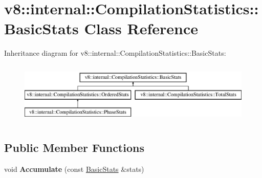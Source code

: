 \hypertarget{classv8_1_1internal_1_1_compilation_statistics_1_1_basic_stats}{}\section{v8\+:\+:internal\+:\+:Compilation\+Statistics\+:\+:Basic\+Stats Class Reference}
\label{classv8_1_1internal_1_1_compilation_statistics_1_1_basic_stats}
Inheritance diagram for v8\+:\+:internal\+:\+:Compilation\+Statistics\+:\+:Basic\+Stats\+:\begin{figure}[H]
\begin{center}
\leavevmode
\includegraphics[height=2.968198cm]{classv8_1_1internal_1_1_compilation_statistics_1_1_basic_stats}
\end{center}
\end{figure}
\subsection*{Public Member Functions}
\begin{DoxyCompactItemize}
\item 
void {\bfseries Accumulate} (const \hyperlink{classv8_1_1internal_1_1_compilation_statistics_1_1_basic_stats}{Basic\+Stats} \&stats)\hypertarget{classv8_1_1internal_1_1_compilation_statistics_1_1_basic_stats_a94b970ba3ece65f2c7490949e54d76c3}{}\label{classv8_1_1internal_1_1_compilation_statistics_1_1_basic_stats_a94b970ba3ece65f2c7490949e54d76c3}

\end{DoxyCompactItemize}
